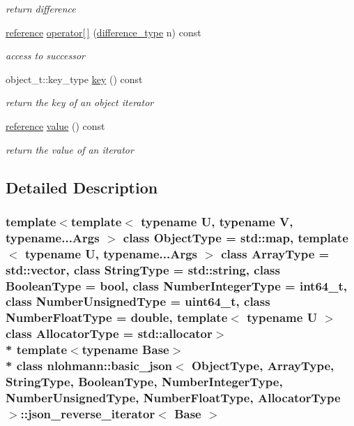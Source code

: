 \begin{DoxyCompactItemize}
\begin{DoxyCompactList}\small\item\em return difference \end{DoxyCompactList}\item 
\hyperlink{a00080_a7265535f39299824f9712a2ca15013c3}{reference} \hyperlink{a00080_ad4ec2bbb8347e7aa3b58e616fd6c7f40}{operator\mbox{[}$\,$\mbox{]}} (\hyperlink{a00025_aec316934a555dd1acdd3600e5d4a4cdf}{difference\+\_\+type} n) const \hypertarget{a00080_ad4ec2bbb8347e7aa3b58e616fd6c7f40}{}\label{a00080_ad4ec2bbb8347e7aa3b58e616fd6c7f40}

\begin{DoxyCompactList}\small\item\em access to successor \end{DoxyCompactList}\item 
object\+\_\+t\+::key\+\_\+type \hyperlink{a00080_acecae6d237fcf14c909fb42b9d2e2955}{key} () const \hypertarget{a00080_acecae6d237fcf14c909fb42b9d2e2955}{}\label{a00080_acecae6d237fcf14c909fb42b9d2e2955}

\begin{DoxyCompactList}\small\item\em return the key of an object iterator \end{DoxyCompactList}\item 
\hyperlink{a00080_a7265535f39299824f9712a2ca15013c3}{reference} \hyperlink{a00080_aca5116682e206dac48f8a56716a3280b}{value} () const \hypertarget{a00080_aca5116682e206dac48f8a56716a3280b}{}\label{a00080_aca5116682e206dac48f8a56716a3280b}

\begin{DoxyCompactList}\small\item\em return the value of an iterator \end{DoxyCompactList}\end{DoxyCompactItemize}


\subsection{Detailed Description}
\subsubsection*{template$<$template$<$ typename U, typename V, typename...\+Args $>$ class Object\+Type = std\+::map, template$<$ typename U, typename...\+Args $>$ class Array\+Type = std\+::vector, class String\+Type = std\+::string, class Boolean\+Type = bool, class Number\+Integer\+Type = int64\+\_\+t, class Number\+Unsigned\+Type = uint64\+\_\+t, class Number\+Float\+Type = double, template$<$ typename U $>$ class Allocator\+Type = std\+::allocator$>$\\*
template$<$typename Base$>$\\*
class nlohmann\+::basic\+\_\+json$<$ Object\+Type, Array\+Type, String\+Type, Boolean\+Type, Number\+Integer\+Type, Number\+Unsigned\+Type, Number\+Float\+Type, Allocator\+Type $>$\+::json\+\_\+reverse\+\_\+iterator$<$ Base $>$}

